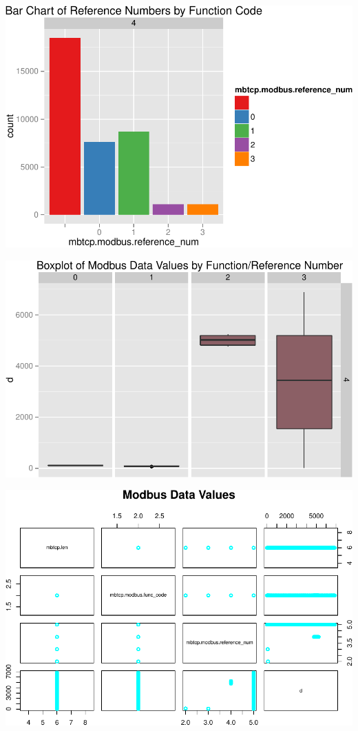 \documentclass[]{article}
\begin{document}
\begin{center}\includegraphics{sew_files/figure-latex/unnamed-chunk-24-1} \end{center}

\pagebreak

\includegraphics{sew_files/figure-latex/unnamed-chunk-25-1.pdf}

\includegraphics{sew_files/figure-latex/unnamed-chunk-26-1.pdf}
\end{document}
